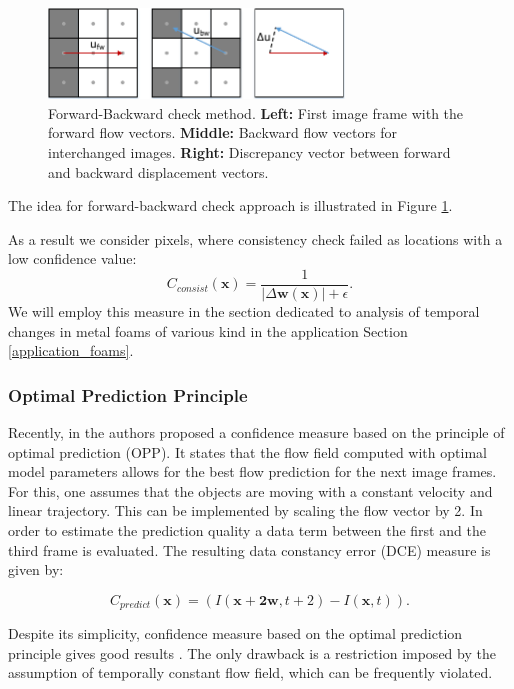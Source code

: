 \begin{figure}[h]
  \centerline{
    \mbox{\includegraphics[width=0.7\textwidth]{figures/fig_23_p43.pdf}} 
  }
  \caption[Forward-Backward check method]{Forward-Backward check method. \textbf{Left:} First image frame with the forward flow vectors. \textbf{Middle:} Backward flow vectors for interchanged images. \textbf{Right:} Discrepancy vector between forward and backward displacement vectors.}
  \label{fig:4_forw_back}
\end{figure}

The idea for forward-backward check approach is illustrated in Figure \ref{fig:4_forw_back}. 

As a result we consider pixels, where consistency check failed as locations with a low confidence value:
$$ C_{consist}(\textbf{x}) = \frac{1}{|\Delta \textbf{w}(\textbf{x})| + \epsilon}. $$
 We will employ this measure in the section dedicated to analysis of temporal changes in metal foams of various kind in the application Section \ref{application_foams}. 


\subsubsection{Optimal Prediction Principle}
\label{optimal_prediction_principle}

Recently, in \cite{HarmonyFlow} the authors proposed a confidence measure based on the principle of optimal prediction (OPP). It states that the flow field computed with optimal model parameters allows for the best flow prediction for the next image frames. For this, one assumes that the objects are moving with a constant velocity and linear trajectory. 
This can be implemented by scaling the flow vector by 2.  
In order to estimate the prediction quality a data term between the first and the third frame is evaluated. The resulting data constancy error (DCE) measure is given by: 

$$ C_{predict}(\textbf{x}) = (I(\textbf{x} + \textbf{2w}, t+2) - I(\textbf{x}, t)). $$

Despite its simplicity, confidence measure based on the optimal prediction principle gives good results \cite{HarmonyFlow}. The only drawback is a restriction imposed by the assumption of temporally constant flow field, which can be frequently violated.

